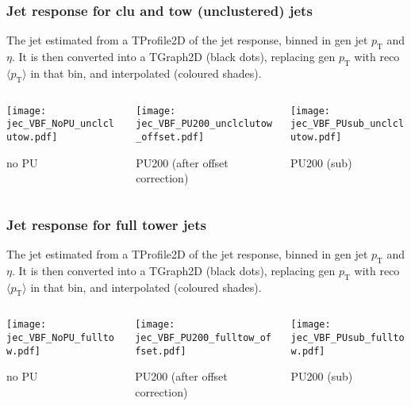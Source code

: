 \documentclass[8pt]{beamer}
\begin{document}
 \begin{frame}
  \frametitle{Jet response for clu and tow (unclustered) jets}
  
  The jet estimated from a TProfile2D of the jet response, binned in gen jet $p_\text{T}$ and $\eta$. It is then converted into a TGraph2D (black dots), replacing gen $p_\text{T}$ with reco $\langle p_\text{T} \rangle$ in that bin, and interpolated (coloured shades).
  
  \vspace{15pt}
  
  \begin{columns}
   \begin{column}{0.35\textwidth}
    \texttt{[image: jec\_VBF\_NoPU\_unclclutow.pdf]}
    
    no PU
   \end{column}
   \begin{column}{0.35\textwidth}
    \texttt{[image: jec\_VBF\_PU200\_unclclutow\_offset.pdf]}
    
    PU200 (after offset correction)
   \end{column}
   \begin{column}{0.35\textwidth}
    \texttt{[image: jec\_VBF\_PUsub\_unclclutow.pdf]}
    
    PU200 (sub)
   \end{column}
  \end{columns}

 \end{frame}
 
 \begin{frame}
  \frametitle{Jet response for full tower jets}
  
  The jet estimated from a TProfile2D of the jet response, binned in gen jet $p_\text{T}$ and $\eta$. It is then converted into a TGraph2D (black dots), replacing gen $p_\text{T}$ with reco $\langle p_\text{T} \rangle$ in that bin, and interpolated (coloured shades).
  
  \vspace{15pt}
  
  \begin{columns}
   \begin{column}{0.35\textwidth}
    \texttt{[image: jec\_VBF\_NoPU\_fulltow.pdf]}
    
    no PU
   \end{column}
   \begin{column}{0.35\textwidth}
    \texttt{[image: jec\_VBF\_PU200\_fulltow\_offset.pdf]}
    
    PU200 (after offset correction)
   \end{column}
   \begin{column}{0.35\textwidth}
    \texttt{[image: jec\_VBF\_PUsub\_fulltow.pdf]}
    
    PU200 (sub)
   \end{column}
  \end{columns}

 \end{frame}
\end{document}
